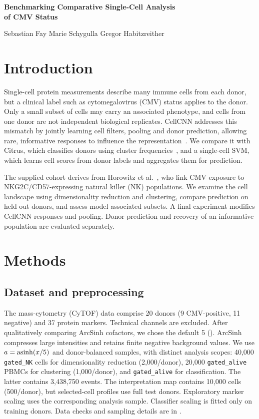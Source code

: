 \documentclass[11pt,a4paper]{article}
\begin{document}
\begin{center}
{\Large\bfseries Benchmarking Comparative Single-Cell Analysis\\of CMV Status\par}
\vspace{3pt}
Sebastian Fay \quad Marie Schygulla \quad Gregor Habitzreither
\end{center}
\vspace{-6pt}

\section{Introduction}
Single-cell protein measurements describe many immune cells from each donor, but a clinical label such as cytomegalovirus (CMV) status applies to the donor. Only a small subset of cells may carry an associated phenotype, and cells from one donor are not independent biological replicates. CellCNN addresses this mismatch by jointly learning cell filters, pooling and donor prediction, allowing rare, informative responses to influence the representation~\cite{cellcnn}. We compare it with Citrus, which classifies donors using cluster frequencies~\cite{citrus}, and a single-cell SVM, which learns cell scores from donor labels and aggregates them for prediction.

The supplied cohort derives from Horowitz et al.~\cite{horowitz}, who link CMV exposure to NKG2C/CD57-expressing natural killer (NK) populations. We examine the cell landscape using dimensionality reduction and clustering, compare prediction on held-out donors, and assess model-associated subsets. A final experiment modifies CellCNN responses and pooling. Donor prediction and recovery of an informative population are evaluated separately.

\section{Methods}
\subsection{Dataset and preprocessing}
The mass-cytometry (CyTOF) data comprise 20 donors (9 CMV-positive, 11 negative) and 37 protein markers. Technical channels are excluded. After qualitatively comparing ArcSinh cofactors, we chose the default 5 (). ArcSinh compresses large intensities and retains finite negative background values. We use $a=\operatorname{asinh}(x/5)$ and donor-balanced samples, with distinct analysis scopes: 40,000 \texttt{gated\_NK} cells for dimensionality reduction (2,000/donor), 20,000 \texttt{gated\_alive} PBMCs for clustering (1,000/donor), and \texttt{gated\_alive} for classification. The latter contains 3,438,750 events. The interpretation map contains 10,000 cells (500/donor), but selected-cell profiles use full test donors. Exploratory marker scaling uses the corresponding analysis sample. Classifier scaling is fitted only on training donors. Data checks and sampling details are in .
\end{document}
